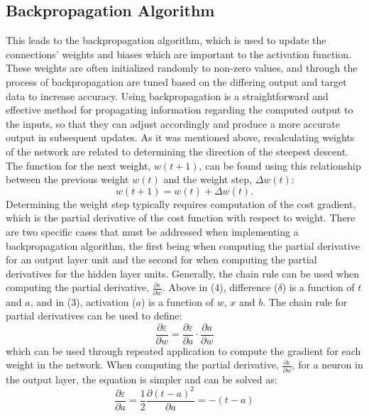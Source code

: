 \documentclass[twocolumn]{article}
\begin{document}
\subsection{Backpropagation Algorithm}
This leads to the backpropagation algorithm, which is used to update the connections' weights and biases which are important to the activation function. These weights are often initialized randomly to non-zero values, and through the process of backpropagation are tuned based on the differing output and target data to increase accuracy. Using backpropagation is a straightforward and effective method for propagating information regarding the computed output to the inputs, so that they can adjust accordingly and produce a more accurate output in subsequent updates. \cite{lisbon} As it was mentioned above, recalculating weights of the network are related to determining the direction of the steepest descent. The function for the next weight, $w(t+1)$, can be found using this relationship between the previous weight $w(t)$ and the weight step, $\Delta w(t)$:
\begin{equation}
    w(t+1) = w(t) + \Delta w(t).
\end{equation}
Determining the weight step typically requires computation of the cost gradient, which is the partial derivative of the cost function with respect to weight. \cite{reid} There are two specific cases that must be addressed when implementing a backpropagation algorithm, the first being when computing the partial derivative for an output layer unit and the second for when computing the partial derivatives for the hidden layer units. Generally, the chain rule can be used when computing the partial derivative, $\frac{\partial \varepsilon  }{\partial w}$. Above in (4), difference ($\delta$) is a function of $t$ and $a$, and in (3), activation ($a$) is a function of $w$, $x$ and $b$. The chain rule for partial derivatives can be used to define:
\begin{equation}
    \frac{\partial \varepsilon  }{\partial w} =  \frac{\partial \varepsilon  }{\partial a} \cdot  \frac{\partial a  }{\partial w}
\end{equation}
which can be used through repeated application to compute the gradient for each weight in the network. \cite{reid} When computing the partial derivative, $\frac{\partial \varepsilon }{\partial w}$, for a neuron in the output layer, the equation is simpler and can be solved as:
\begin{equation}
        \frac{\partial \varepsilon }{\partial a} =  \frac{1}{2}\frac{\partial (t-a)^{2}  }{\partial a} = -(t-a)
\end{equation}
\end{document}
